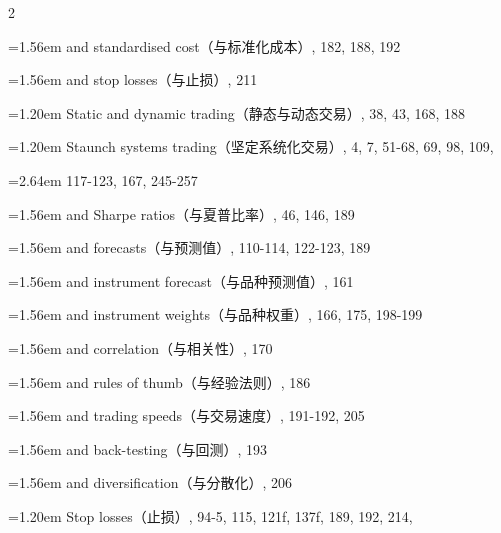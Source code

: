 {\begin{multicols}{2}
\par \noindent\hangindent=1.56em\hspace*{0.36em} and standardised cost（与标准化成本）, 182, 188, 192
\par \noindent\hangindent=1.56em\hspace*{0.36em} and stop losses（与止损）, 211
\par \noindent\hangindent=1.20em\hspace*{0.00em} Static and dynamic trading（静态与动态交易）, 38, 43, 168, 188
\par \noindent\hangindent=1.20em\hspace*{0.00em} Staunch systems trading（坚定系统化交易）, 4, 7, 51-68, 69, 98, 109,
\par \noindent\hangindent=2.64em\hspace*{1.44em} 117-123, 167, 245-257
\par \noindent\hangindent=1.56em\hspace*{0.36em} and Sharpe ratios（与夏普比率）, 46, 146, 189
\par \noindent\hangindent=1.56em\hspace*{0.36em} and forecasts（与预测值）, 110-114, 122-123, 189
\par \noindent\hangindent=1.56em\hspace*{0.36em} and instrument forecast（与品种预测值）, 161
\par \noindent\hangindent=1.56em\hspace*{0.36em} and instrument weights（与品种权重）, 166, 175, 198-199
\par \noindent\hangindent=1.56em\hspace*{0.36em} and correlation（与相关性）, 170
\par \noindent\hangindent=1.56em\hspace*{0.36em} and rules of thumb（与经验法则）, 186
\par \noindent\hangindent=1.56em\hspace*{0.36em} and trading speeds（与交易速度）, 191-192, 205
\par \noindent\hangindent=1.56em\hspace*{0.36em} and back-testing（与回测）, 193
\par \noindent\hangindent=1.56em\hspace*{0.36em} and diversification（与分散化）, 206
\par \noindent\hangindent=1.20em\hspace*{0.00em} Stop losses（止损）, 94-5, 115, 121f, 137f, 189, 192, 214,

\end{multicols}}
